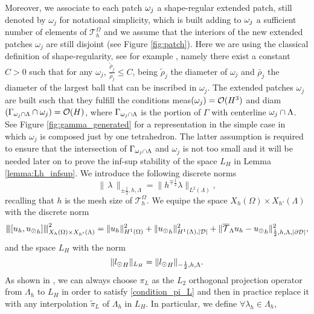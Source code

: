 Moreover, we associate to each patch $\omega _j$ a shape-regular extended patch, still denoted by $\omega_j$ for notational simplicity, which is built adding to $\omega _j$ a sufficient number of elements of $\mathcal{T}_h^{\Omega}$ and we assume that the interiors of the new extended patches $\omega _j$ are still disjoint (see Figure \ref{fig:patch}). Here we are using the classical definition of shape-regularity, see for example \cite{MR2050138}, namely there exist a constant $C>0$ such that for any $\omega_j$, $\frac{\tilde{\rho}_j}{\bar{\rho}_j}\leq C$, being $\tilde{\rho}_j$ the diameter of $\omega_j$ and $\bar{\rho}_j$ the diameter of the largest ball that can be inscribed in $\omega_j$. The extended patches $\omega _j$ are built such that they fulfill the conditions meas$(\omega _j)=\mathcal{O}(H^3)$ and diam$(\Gamma_{\omega _j\cap \Lambda}\cap \omega_j)=\mathcal{O}(H)$, where $\Gamma_{\omega _j\cap \Lambda}$ is the portion of $\Gamma$ with centerline $\omega _j\cap \Lambda$. See Figure \ref{fig:gamma_generated} for a representation in the simple case in which $\omega _j$ is composed just by one tetrahedron. The latter assumption is required to ensure that the intersection of $\Gamma_{\omega _j\cap \Lambda}$ and $\omega_j$ is not too small and it will be needed later on to prove the inf-sup stability of the space $L_H$ in Lemma \ref{lemma:Lh_infsup}. We introduce the following discrete norms
\begin{equation*}
\|\, \lambda \,\|_{\pm \frac 12, h, \Lambda} = \|h^{\mp\frac 12} \lambda\|_{L^2(\Lambda)},
\end{equation*}
recalling that $h$ is the mesh size of $\mathcal{T}^\Omega_{h}$. We equipe the space $X_h(\Omega)\times X_{h'}(\Lambda)$ with the discrete norm
\begin{equation*}
{\left\vert\kern-0.25ex\left\vert\kern-0.25ex\left\vert [u_h, {u_{\odot}}_h] \right\vert\kern-0.25ex\right\vert\kern-0.25ex\right\vert}^2_{X_h(\Omega)\times X_{h'}(\Lambda) }
= \|u_h\|^2_{H^1(\Omega)}+\|{u_{\odot}}_h\|^2_{H^1(\Lambda),|\mathcal{D}|} + \|{\overline{\mathcal{T}}_\Lambda} u_h - {u_{\odot}}_h\|^2_{\frac 12, h, \Lambda, |\partial\mathcal{D}|},
\end{equation*}
and the space $L_H$ with the norm 
\begin{equation*}
\|{l_{\odot}}_H \|_{L_H} = \|{l_{\odot}}_H \|_{-\frac 12, h, \Lambda}.
\end{equation*}
As shown in \cite[Section III]{burman2014}, we can always choose $\pi_L$ as the $L_2$ orthogonal projection operator from $\Lambda_h$ to $L_H$ in order to satisfy \eqref{condition_pi_L} and then in practice replace it with any interpolation $\tilde{\pi}_L$ of $\Lambda_h$ in $L_H$. In particular, we define $\forall \lambda_h \in \Lambda_h$,
